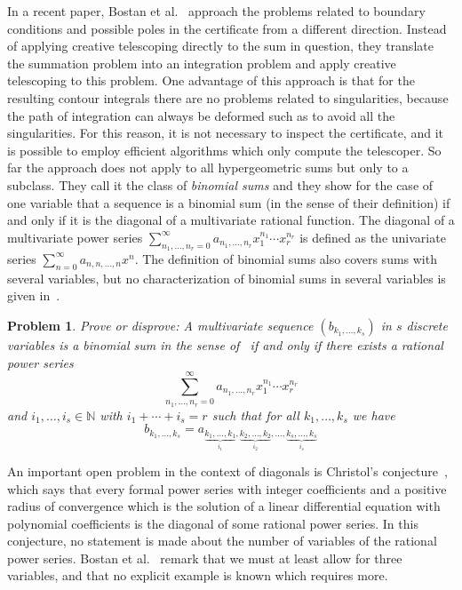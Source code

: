 \documentclass[a4paper,draft]{amsart}
\let\set\mathbb
\newtheorem{problem}{Problem}
\begin{document}
 In a recent paper, Bostan et al.~\cite{bostan15} approach the problems related to boundary
 conditions and possible poles in the certificate from a different direction. Instead of applying
 creative telescoping directly to the sum in question, they translate the summation
 problem into an integration problem and apply creative telescoping to this problem.
 One advantage of this approach is that for the resulting contour integrals
 there are no problems related to singularities, because the path of integration can
 always be deformed such as to avoid all the singularities. For this reason, it is not
 necessary to inspect the certificate, and it is possible to employ efficient algorithms
 which only compute the telescoper.
 So far the approach does not apply to all hypergeometric sums but only to a subclass. They
 call it the class of \emph{binomial sums} and they show for the case of one variable
 that a sequence is a binomial sum (in the sense of their definition) if and only if it
 is the diagonal of a multivariate rational function. The diagonal of a multivariate
 power series $\sum_{n_1,\dots,n_r=0}^\infty a_{n_1,\dots,n_r}x_1^{n_1}\cdots x_r^{n_r}$
 is defined as the univariate series $\sum_{n=0}^\infty a_{n,n,\dots,n}x^n$.
 The definition of binomial sums also covers sums with several variables, but no
 characterization of binomial sums in several variables is given in~\cite{bostan15}.

 \begin{problem}
   Prove or disprove:
   A multivariate sequence $(b_{k_1,\dots,k_s})$ in $s$ discrete variables is a binomial
   sum in the sense of~\cite{bostan15}
   if and only if there exists a rational power series
   \[\sum_{n_1,\dots,n_r=0}^\infty a_{n_1,\dots,n_r}x_1^{n_1}\cdots x_r^{n_r}\]
   and $i_1,\dots,i_s\in\set N$ with $i_1+\cdots+i_s=r$ such that
   for all $k_1,\dots,k_s$ we have
   \[
   b_{k_1,\dots,k_s}=a_{
     \underbrace{\scriptstyle k_1,\dots,k_1}_{i_1},
     \underbrace{\scriptstyle k_2,\dots,k_2}_{i_2},\dots,
     \underbrace{\scriptstyle k_s,\dots,k_s}_{i_s}}
   \]
 \end{problem}

 An important open problem in the context of diagonals is Christol's
 conjecture~\cite{christol88}, which says that every formal power series with integer
 coefficients and a positive radius of convergence which is the solution of a
 linear differential equation with polynomial coefficients is the diagonal of
 some rational power series. In this conjecture, no statement is made about the
 number of variables of the rational power series. Bostan et al.~\cite{bostan15}
 remark that we must at least allow for three variables, and that no explicit
 example is known which requires more.
\end{document}
